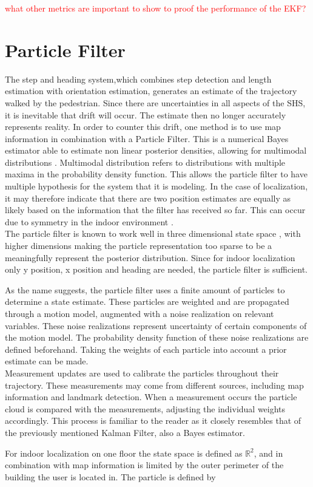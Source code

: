 \textcolor{red}{what other metrics are important to show to proof the performance of the EKF?}

\newpage
\section{Particle Filter}
\label{sec:method-pf}
The step and heading system,which combines step detection and length estimation with orientation estimation, generates an estimate of the trajectory walked by the pedestrian. Since there are uncertainties in all aspects of the SHS, it is inevitable that drift will occur. The estimate then no longer accurately represents reality. In order to counter this drift, one method is to use map information in combination with a Particle Filter. This is a numerical Bayes estimator able to estimate non linear posterior densities, allowing for multimodal distributions \cite{gustafsson2010particle,kihlberg2012map}. Multimodal distribution refers to distributions with multiple maxima in the probability density function. This allows the particle filter to have multiple hypothesis for the system that it is modeling. In the case of localization, it may therefore indicate that there are two position estimates are equally as likely based on the information that the filter has received so far. This can occur due to symmetry in the indoor environment \cite{Woodman2008}. \\
The particle filter is known to work well in three dimensional state space \cite{gustafsson2010particle}, with higher dimensions making the particle representation too sparse to be a meaningfully represent the posterior distribution. Since for indoor localization only y position, x position and heading are needed, the particle filter is sufficient.
\par
As the name suggests, the particle filter uses a finite amount of particles to determine a state estimate. These particles are weighted and are propagated through a motion model, augmented with a noise realization on relevant variables. These noise realizations represent uncertainty of certain components of the motion model. The probability density function of these noise realizations are defined beforehand. Taking the weights of each particle into account a prior estimate can be made. \\
Measurement updates are used to calibrate the particles throughout their trajectory. These measurements may come from different sources, including map information and landmark detection. When a measurement occurs the particle cloud is compared with the measurements, adjusting the individual weights accordingly. This process is familiar to the reader as it closely resembles that of the previously mentioned Kalman Filter, also a Bayes estimator.\par
For indoor localization on one floor the state space is defined as $\mathbb{R}^{2}$, and in combination with map information is limited by the outer perimeter of the building the user is located in. The particle is defined by 

